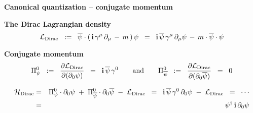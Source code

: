 \begin{frame}{\headingColor\bf\Large Canonical quantization -- conjugate momentum}

\small

\vskip 0.5cm
\textbf{The Dirac Lagrangian density}
\begin{equation*}
\mathcal{L}_{\textnormal{Dirac}}
\;\; := \;\;
	\overline{\psi}\cdot\left(\,\textnormal{\bf i}\,\gamma^{\mu}\,\partial_{\mu}\,-\,m\,\right)\psi
\;\; = \;\;
	\textnormal{\bf i}\,\overline{\psi}\,\gamma^{\mu}\,\partial_{\mu}\psi \,-\, m\cdot\overline{\psi}\cdot\psi
\end{equation*}

\vskip 0.5cm
\textbf{Conjugate momentum}
\begin{equation*}
\Pi_{\psi}^{0}
\;\; := \;\;
	\dfrac{\partial\mathcal{L}_{\textnormal{Dirac}}}{\partial(\partial_{0}\psi)}
\;\; = \;\;
	\textnormal{\bf i}\,\overline{\psi}\,\gamma^{0}
\quad\quad\textnormal{and}\quad\quad
\Pi_{\overline{\psi}}^{0}
\;\; := \;\;
	\dfrac{\partial\mathcal{L}_{\textnormal{Dirac}}}{\partial(\partial_{0}\overline{\psi})}
\;\; = \;\;
	0
\end{equation*}

\begin{eqnarray*}
\mathcal{H}_{\textnormal{Dirac}}
& = &
	\Pi_{\psi}^{0}\cdot\partial_{0}\psi
	\;+\; \Pi_{\overline{\psi}}^{0}\cdot\partial_{0}\overline{\psi}
	\;-\; \mathcal{L}_{\textnormal{Dirac}}
\;\; = \;\;
	\textnormal{\bf i}\,\overline{\psi}\,\gamma^{0}\,\partial_{0}\psi
	\;-\; \mathcal{L}_{\textnormal{Dirac}}
\;\; = \;\;
	\cdots
\\
& = &
	\psi^{\dagger}\,\textnormal{\bf i}\,\partial_{0}\psi
\end{eqnarray*}

\end{frame}
\normalsize

